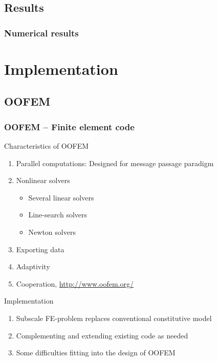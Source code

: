 \documentclass[11pt,mathserif]{beamer}
\begin{document}
\subsection{Results}
\begin{frame}
 \frametitle{Numerical results}
\begin{center}

\end{center}
\end{frame}

\section{Implementation}
\subsection{OOFEM}
\begin{frame}
 \frametitle{OOFEM -- Finite element code}
 Characteristics of OOFEM
 \begin{enumerate}
  \item<1-> Parallel computations: Designed for message passage paradigm
  \item<1-> Nonlinear solvers
  \begin{itemize}
   \item<1-> Several linear solvers
   \item<1-> Line-search solvers
   \item<1-> Newton solvers
  \end{itemize}
  \item<1-> Exporting data
  \item<1-> Adaptivity
  \item<1-> Cooperation, \url{http://www.oofem.org/}
 \end{enumerate}

  Implementation
 \begin{enumerate}
  \item<2-> Subscale FE-problem replaces conventional constitutive model
  \item<2-> Complementing and extending existing code as needed
  \item<2-> Some difficulties fitting into the design of OOFEM
 \end{enumerate}

\end{frame}
\end{document}
